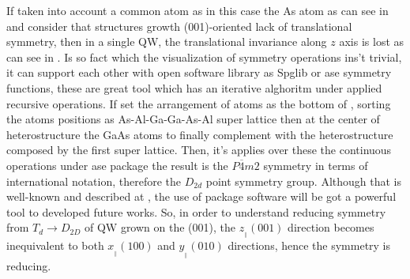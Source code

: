 If taken into account a common atom as in this case the As atom as can see in 
 and consider that structures growth (001)-oriented lack of translational symmetry\cite{ivchenko1996heavylight}, then in a single QW, the translational invariance along $z$ axis is lost\cite{tronc2000bound} as can see in . Is so fact which the visualization of symmetry operations ins't trivial, it can support each other with  open software library as \gls{Spglib} or \gls{ase}  symmetry functions, these are great tool which has an iterative alghoritm under applied recursive operations. If set the arrangement of atoms as the bottom of , sorting the atoms positions as As-Al-Ga-Ga-As-Al super lattice then at the center of heterostructure the GaAs atoms to finally complement with the heterostructure composed by the first super lattice. Then, it's applies over these the continuous operations under \gls{ase} package the result is the $P\overline{4}m2$ symmetry in terms of international notation, therefore the $D_{2d}$ point symmetry group. 
Although that is well-known and described at \cite{tronc2000bound,ivchenko1996heavylight,glazov2018electron,krebs1996giant,magri2000anticrossing,chen2002interface,ivchenko2008spinphoto}, the use of package software will be got a powerful tool to developed future works. So, in order to understand reducing symmetry from $T_{d}\to D_{2D}$ of QW grown on the (001), the $z_{_{\parallel}}(001)$ direction becomes inequivalent to both $x_{_{\parallel}}(100)$ and $y_{_{\parallel}}(010)$ directions, hence the symmetry is reducing. 

